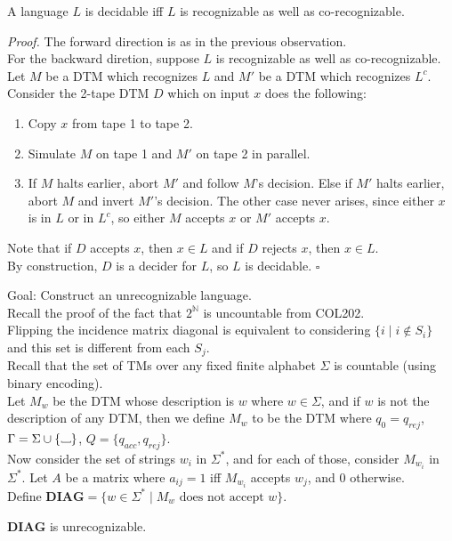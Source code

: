 \documentclass[a4paper]{article}
\newenvironment{proof}{\begin{breakbox}\textit{Proof.}}{\hfill$\square$\end{breakbox}}
\newcommand{\nl}{\vspace{0.2cm}\\}
\newcommand{\mf}{\mathbf}
\newcommand{\mb}{\mathbb}
\newcommand\Vtextvisiblespace[1][.3em]{%
    \mbox{\kern.06em\vrule height.3ex}%
    \vbox{\hrule width#1}%
    \hbox{\vrule height.3ex}
}
\newcommand{\blank}{{\Vtextvisiblespace[0.7em]}}
\begin{document}
\begin{theorem}
    A language $L$ is decidable iff $L$ is recognizable as well as co-recognizable.
\end{theorem}
\begin{proof}
    The forward direction is as in the previous observation.\nl
    For the backward diretion, suppose $L$ is recognizable as well as co-recognizable. Let $M$ be a DTM which recognizes $L$ and $M'$ be a DTM which recognizes $L^c$. Consider the
    2-tape DTM $D$ which on input $x$ does the following:
    \begin{enumerate}
        \item Copy $x$ from tape 1 to tape 2.
        \item Simulate $M$ on tape 1 and $M'$ on tape 2 in parallel.
        \item If $M$ halts earlier, abort $M'$ and follow $M$'s decision. Else if $M'$ halts earlier, abort $M$ and invert $M'$'s decision. The other case never arises, since either $x$ is in $L$
            or in $L^c$, so either $M$ accepts $x$ or $M'$ accepts $x$.
    \end{enumerate}
    Note that if $D$ accepts $x$, then $x \in L$ and if $D$ rejects $x$, then $x \in L$.\nl
    By construction, $D$ is a decider for $L$, so $L$ is decidable.
\end{proof}

Goal: Construct an unrecognizable language.\nl

Recall the proof of the fact that $2^{\mb{N}}$ is uncountable from COL202.\nl
Flipping the incidence matrix diagonal is equivalent to considering $\{i \mid i \not\in S_i\}$ and this set is different from each $S_j$.\nl

Recall that the set of TMs over any fixed finite alphabet $\Sigma$ is countable (using binary encoding).\nl
Let $M_w$ be the DTM whose description is $w$ where $w \in \Sigma$, and if $w$ is not the description of any DTM, then we define $M_w$ to be the DTM where $q_0 = q_{rej}$, $\Gamma = \Sigma \cup
\{\blank\}$, $Q = \{q_{acc}, q_{rej}\}$.\nl

Now consider the set of strings $w_i$ in $\Sigma^*$, and for each of those, consider $M_{w_i}$ in $\Sigma^*$. Let $A$ be a matrix where $a_{ij} = 1$ iff $M_{w_i}$ accepts $w_j$, and $0$
otherwise.\nl

Define $\mf{DIAG} = \{w \in \Sigma^* \mid M_w \text{ does not accept } w\}$.

\begin{theorem}
    $\mf{DIAG}$ is unrecognizable.
\end{theorem}
\end{document}
